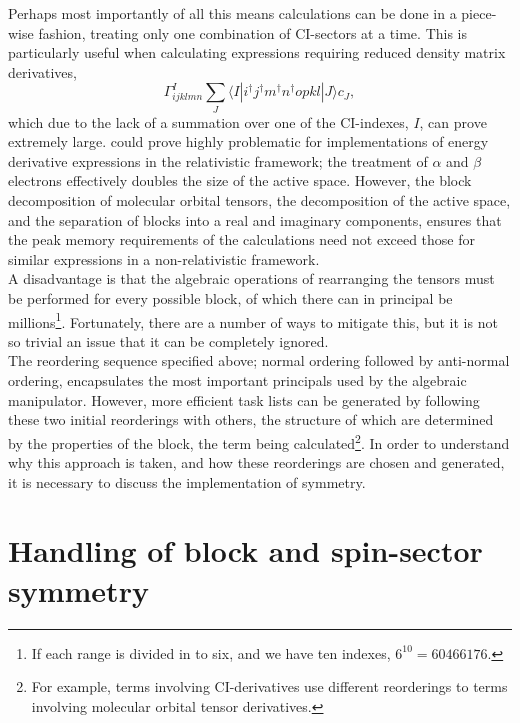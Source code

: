 \documentclass[12pt]{article}
\begin{document}
\noindent Perhaps most importantly of all this means calculations
can be done in a piece-wise fashion, treating only one combination of CI-sectors
at a time. This is particularly useful when calculating expressions requiring reduced density matrix derivatives,
\begin{equation}
\Gamma^{I}_{ijklmn}\sum_{J}\langle I | i^{\dagger}j^{\dagger}m^{\dagger}n^{\dagger}opkl | J \rangle c_{J},
\end{equation}
which due to the lack of a summation over one of the CI-indexes, $I$, can prove extremely large. 
could prove highly problematic for implementations of energy derivative expressions in the
relativistic framework; the treatment of $\alpha$ and $\beta$ electrons effectively doubles
the size of the active space. However, the block decomposition of molecular orbital tensors,
the decomposition of the active space, and the separation of blocks into
a real and imaginary components, ensures that the peak memory requirements of the 
calculations need not exceed those for similar expressions in a non-relativistic framework.\\

\noindent A disadvantage is that the algebraic operations of
rearranging the tensors must be performed for every possible block, of which
there can in principal be millions\footnote{ If each range is divided in to 
six, and we have ten indexes, $6^{10} =60466176 $. }. Fortunately, there
are a number of ways to mitigate this, but it is not so trivial an issue that it can
be completely ignored.\\

\noindent The reordering sequence specified above; normal ordering followed by anti-normal 
ordering, encapsulates the most important principals used by the algebraic manipulator. However,
more efficient task lists can be generated by following these two initial reorderings with others, the
structure of which are determined by the properties of the block, the term being calculated\footnote{
For example, terms involving CI-derivatives use different reorderings to terms involving molecular orbital
tensor derivatives.}. In order to understand why this approach is taken, and how these reorderings
are chosen and generated, it is necessary to discuss the implementation of symmetry.

\section{Handling of block and spin-sector symmetry}
\end{document}
